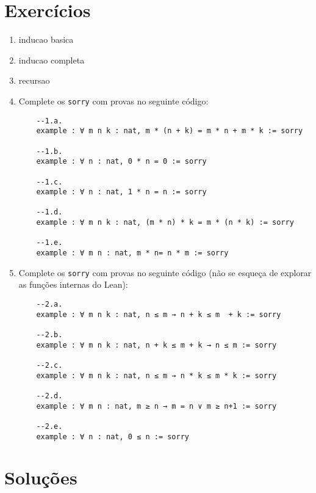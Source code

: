 \section{Exercícios}

\begin{enumerate}
    \item inducao basica
    
    \item inducao completa
    
    \item recursao
    
    \item Complete os \lstinline{sorry} com provas no seguinte código:
    
    \begin{lstlisting}
    --1.a.
    example : ∀ m n k : nat, m * (n + k) = m * n + m * k := sorry
    
    --1.b.
    example : ∀ n : nat, 0 * n = 0 := sorry
    
    --1.c.
    example : ∀ n : nat, 1 * n = n := sorry
    
    --1.d.
    example : ∀ m n k : nat, (m * n) * k = m * (n * k) := sorry
    
    --1.e.
    example : ∀ m n : nat, m * n= n * m := sorry
    \end{lstlisting}
    
    \item Complete os \lstinline{sorry} com provas no seguinte código (não se esqueça de explorar as funções internas do Lean):
    
    \begin{lstlisting}
    --2.a.
    example : ∀ m n k : nat, n ≤ m → n + k ≤ m  + k := sorry
    
    --2.b.
    example : ∀ m n k : nat, n + k ≤ m + k → n ≤ m := sorry
    
    --2.c.
    example : ∀ m n k : nat, n ≤ m → n * k ≤ m * k := sorry
    
    --2.d.
    example : ∀ m n : nat, m ≥ n → m = n ∨ m ≥ n+1 := sorry
    
    --2.e.
    example : ∀ n : nat, 0 ≤ n := sorry
    \end{lstlisting}
\end{enumerate}

\section{Soluções}

